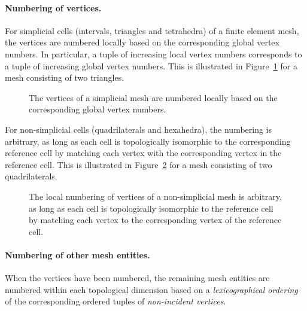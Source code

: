 \paragraph{Numbering of vertices.}

For simplicial cells (intervals, triangles and tetrahedra) of a finite
element mesh, the vertices are numbered locally based on the
corresponding global vertex numbers. In particular, a tuple of
increasing local vertex numbers corresponds to a tuple of increasing
global vertex numbers. This is illustrated in
Figure~\ref{fig:numbering_example_triangles} for a mesh consisting of
two triangles.

\begin{figure}[htbp]
  \begin{center}
    \caption{The vertices of a simplicial mesh are numbered locally
      based on the corresponding global vertex numbers.}
    \label{fig:numbering_example_triangles}
  \end{center}
\end{figure}

For non-simplicial cells (quadrilaterals and hexahedra), the numbering
is arbitrary, as long as each cell is topologically isomorphic to the corresponding
reference cell by matching each vertex with the corresponding vertex
in the reference cell. This is illustrated in
Figure~\ref{fig:numbering_example_quadrilaterals} for a mesh
consisting of two quadrilaterals.

\begin{figure}
  \begin{center}
    \caption{The local numbering of vertices of a non-simplicial mesh
      is arbitrary, as long as each cell is topologically isomorphic
      to the reference cell by matching each vertex to the
      corresponding vertex of the reference cell.}
    \label{fig:numbering_example_quadrilaterals}
  \end{center}
\end{figure}

\paragraph{Numbering of other mesh entities.}

When the vertices have been numbered, the remaining mesh entities are
numbered within each topological dimension based on a
\emph{lexicographical ordering} of the corresponding ordered tuples of
\emph{non-incident vertices}.

